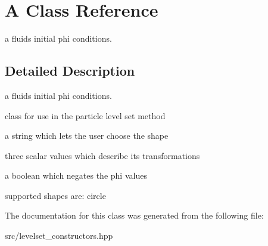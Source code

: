 \hypertarget{classA}{}\section{A Class Reference}
\label{classA}


a fluid\textquotesingle{}s initial phi conditions.  




\subsection{Detailed Description}
a fluid\textquotesingle{}s initial phi conditions. 

class for use in the particle level set method


\begin{DoxyItemize}
\item a string which lets the user choose the shape
\item three scalar values which describe its transformations
\item a boolean which negates the phi values

supported shapes are\+: circle 
\end{DoxyItemize}

The documentation for this class was generated from the following file\+:\begin{DoxyCompactItemize}
\item 
src/levelset\+\_\+constructors.\+hpp\end{DoxyCompactItemize}
